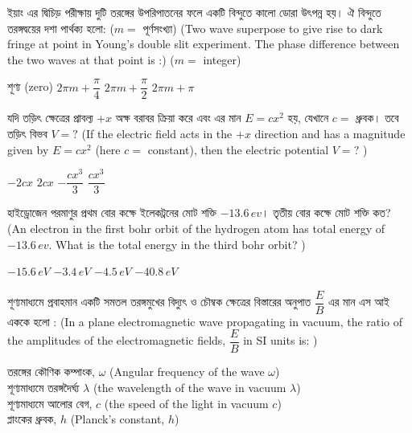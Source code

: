 \documentclass[addpoints]{exam}
\begin{document}
\begin{questions}
\question  ইয়াং এর দ্বিচিড় পরীক্ষায় দুটি তরঙ্গের উপরিপাতনের ফলে একটি বিন্দুতে কালো ডোরা উৎপন্ন হয়। ঐ বিন্দুতে তরঙ্গদ্বয়ের দশা পার্থক্য হলো: ($ m= $ পূর্ণসংখ্যা) (Two wave superpose to give rise to dark fringe at point in Young's double slit experiment. The phase difference between the two waves at that point is :) ($ m= $ integer)

\begin{oneparchoices}
\choice শূণ্য (zero)
\choice $ 2\pi m +\dfrac{\pi}{4}$
\choice $ 2\pi m +\dfrac{\pi}{2}$
\choice $ 2\pi m +\pi $
\end{oneparchoices}

\question  যদি তড়িৎ ক্ষেত্রের প্রাবল্য $ +x $ অক্ষ বরাবর ক্রিয়া করে এবং এর মান $ E=cx^{2} $ হয়, যেখানে $ c= $ ধ্রুবক। তবে তড়িৎ বিভব $ V=? $ (If the electric field acts in the $ +x $ direction and has a magnitude given by $ E=cx^{2} $ (here $ c= $ constant), then the electric potential  $ V=? $ ) 

\begin{oneparchoices}
\choice $ -2cx $
\choice $ 2cx $
\choice $ -\dfrac{cx^{3}}{3} $
\choice $ \dfrac{cx^{3}}{3} $

\end{oneparchoices}

\question  হাইড্রোজেন পরমাণুর প্রথম বোর কক্ষে ইলেকট্রনের মোট শক্তি $ -13.6\,ev $। তৃতীয় বোর কক্ষে মোট শক্তি কত? (An electron in the first bohr orbit of the hydrogen atom has total energy of $ -13.6\,ev $. What is the total energy in the third bohr orbit? )

\begin{oneparchoices}
\choice $ -15.6\,eV $
\choice $ -3.4\,eV $
\choice $ -4.5\,eV $
\choice $ -40.8\,eV $
\end{oneparchoices}

\question শূণ্যমাধ্যমে প্রবাহমান একটি সমতল তরঙ্গমুখের বিদ্যুৎ ও চৌম্বক ক্ষেত্রের বিস্তারের অনুপাত $ \dfrac{E}{B} $ এর মান এস আই এককে হলো : (In a plane electromagnetic wave propagating in vacuum, the ratio of the amplitudes of the electromagnetic fields, $ \dfrac{E}{B} $ in SI units is: )

\begin{oneparchoices}
\choice তরঙ্গের কৌণিক কম্পাংক, $ \omega $ (Angular frequency of the wave $ \omega $)\\
\hspace*{-.3cm}\choice শূণ্যমাধ্যমে তরঙ্গদৈর্ঘ্য $ \lambda $ (the wavelength of the wave in vacuum $ \lambda $)\\
\hspace*{-.3cm}\choice  শূণ্যমাধ্যমে আলোর বেগ, $ c $ (the speed of the light in vacuum $ c $)\\
\hspace*{-.3cm}\choice  প্লাংকের ধ্রুবক, $ h $ (Planck's constant, $ h $)
\end{oneparchoices}


\end{questions}
\end{document}
